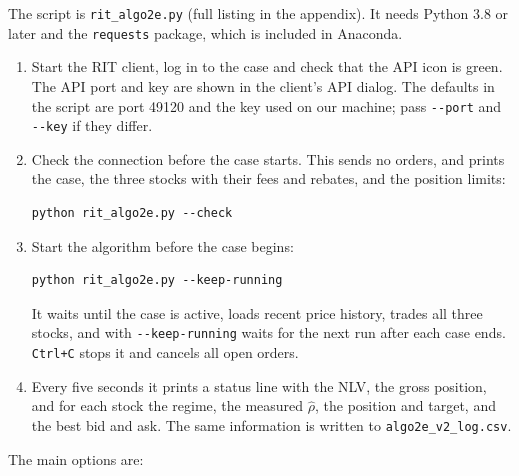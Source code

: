 \documentclass{article}
\begin{document}
The script is \texttt{rit\_algo2e.py} (full listing in the appendix). It needs Python 3.8 or later and the \texttt{requests} package, which is included in Anaconda.
\begin{enumerate}
  \item Start the RIT client, log in to the case and check that the API icon is green. The API port and key are shown in the client's API dialog. The defaults in the script are port 49120 and the key used on our machine; pass \texttt{-{}-port} and \texttt{-{}-key} if they differ.
  \item Check the connection before the case starts. This sends no orders, and prints the case, the three stocks with their fees and rebates, and the position limits:
  \begin{verbatim}
python rit_algo2e.py --check
  \end{verbatim}
  \item Start the algorithm before the case begins:
  \begin{verbatim}
python rit_algo2e.py --keep-running
  \end{verbatim}
  It waits until the case is active, loads recent price history, trades all three stocks, and with \texttt{-{}-keep-running} waits for the next run after each case ends. \texttt{Ctrl+C} stops it and cancels all open orders.
  \item Every five seconds it prints a status line with the NLV, the gross position, and for each stock the regime, the measured $\hat\rho$, the position and target, and the best bid and ask. The same information is written to \texttt{algo2e\_v2\_log.csv}.
\end{enumerate}

\noindent The main options are:
\end{document}
